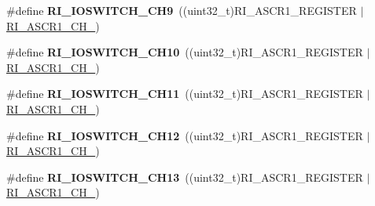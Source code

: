 \begin{DoxyCompactItemize}
\item 
\hypertarget{group___r_i___i_o_switch_gad687cd24d0a17d17694dcf2509b9948b}{\#define {\bfseries R\-I\-\_\-\-I\-O\-S\-W\-I\-T\-C\-H\-\_\-\-C\-H9}~((uint32\-\_\-t)R\-I\-\_\-\-A\-S\-C\-R1\-\_\-\-R\-E\-G\-I\-S\-T\-E\-R $\vert$ \hyperlink{group___peripheral___registers___bits___definition_ga0ed38883e815c56c2dfc1af1084fc04d}{R\-I\-\_\-\-A\-S\-C\-R1\-\_\-\-C\-H\-\_})}\label{group___r_i___i_o_switch_gad687cd24d0a17d17694dcf2509b9948b}

\item 
\hypertarget{group___r_i___i_o_switch_ga1a700c79adf1d50ac943737355bf6c82}{\#define {\bfseries R\-I\-\_\-\-I\-O\-S\-W\-I\-T\-C\-H\-\_\-\-C\-H10}~((uint32\-\_\-t)R\-I\-\_\-\-A\-S\-C\-R1\-\_\-\-R\-E\-G\-I\-S\-T\-E\-R $\vert$ \hyperlink{group___peripheral___registers___bits___definition_gae3c516346dc0c53359bd91ebce3f5d4d}{R\-I\-\_\-\-A\-S\-C\-R1\-\_\-\-C\-H\-\_})}\label{group___r_i___i_o_switch_ga1a700c79adf1d50ac943737355bf6c82}

\item 
\hypertarget{group___r_i___i_o_switch_ga8e6e7b20244dd1775f7874e07e5fec4c}{\#define {\bfseries R\-I\-\_\-\-I\-O\-S\-W\-I\-T\-C\-H\-\_\-\-C\-H11}~((uint32\-\_\-t)R\-I\-\_\-\-A\-S\-C\-R1\-\_\-\-R\-E\-G\-I\-S\-T\-E\-R $\vert$ \hyperlink{group___peripheral___registers___bits___definition_ga8db621c8a0d2fce4fbfb50ee99ae4842}{R\-I\-\_\-\-A\-S\-C\-R1\-\_\-\-C\-H\-\_})}\label{group___r_i___i_o_switch_ga8e6e7b20244dd1775f7874e07e5fec4c}

\item 
\hypertarget{group___r_i___i_o_switch_ga2cde4d3f89293874621433e754066b49}{\#define {\bfseries R\-I\-\_\-\-I\-O\-S\-W\-I\-T\-C\-H\-\_\-\-C\-H12}~((uint32\-\_\-t)R\-I\-\_\-\-A\-S\-C\-R1\-\_\-\-R\-E\-G\-I\-S\-T\-E\-R $\vert$ \hyperlink{group___peripheral___registers___bits___definition_ga3569a064eebb7148cfc450e89e637d11}{R\-I\-\_\-\-A\-S\-C\-R1\-\_\-\-C\-H\-\_})}\label{group___r_i___i_o_switch_ga2cde4d3f89293874621433e754066b49}

\item 
\hypertarget{group___r_i___i_o_switch_gab0fcb464f29430da817b7f6e3311903a}{\#define {\bfseries R\-I\-\_\-\-I\-O\-S\-W\-I\-T\-C\-H\-\_\-\-C\-H13}~((uint32\-\_\-t)R\-I\-\_\-\-A\-S\-C\-R1\-\_\-\-R\-E\-G\-I\-S\-T\-E\-R $\vert$ \hyperlink{group___peripheral___registers___bits___definition_gaed83dec747e47af6e8731ba9a386dba1}{R\-I\-\_\-\-A\-S\-C\-R1\-\_\-\-C\-H\-\_})}\label{group___r_i___i_o_switch_gab0fcb464f29430da817b7f6e3311903a}


\end{DoxyCompactItemize}

